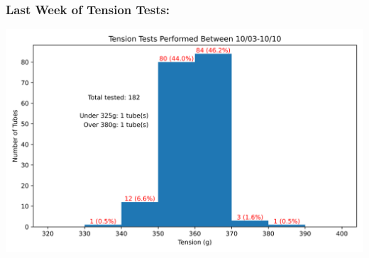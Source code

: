 \documentclass{beamer}
\begin{document}
\begin{frame}
	\frametitle{Last Week of Tension Tests:}
	\includegraphics[width=\linewidth]{"last_week_tt.png"}
\end{frame}
\end{document}
